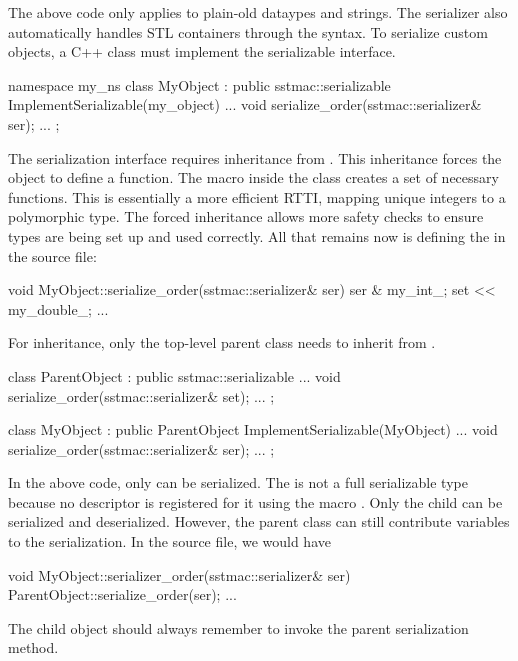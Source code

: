 The above code only applies to plain-old dataypes and strings.
The serializer also automatically handles STL containers
through the \inlinecode{&} syntax.
To serialize custom objects, a C++ class must implement the serializable interface.

\begin{CppCode}
namespace my_ns {
class MyObject : 
  public sstmac::serializable
{
 ImplementSerializable(my_object)
 ...
 void serialize_order(sstmac::serializer& ser);
 ...
};
}
\end{CppCode}
The serialization interface requires inheritance from .
This inheritance forces the object to define a  function.
The macro  inside the class creates a set of necessary functions.
This is essentially a more efficient RTTI, mapping unique integers to a polymorphic type.
The forced inheritance allows more safety checks to ensure types are being set up and used correctly.
All that remains now is defining the  in the source file:

\begin{CppCode}
void MyObject::serialize_order(sstmac::serializer& ser)
{
  ser & my_int_;
  set << my_double_;
  ...
}
\end{CppCode}

For inheritance, only the top-level parent class needs to inherit from .

\begin{CppCode}
class ParentObject : 
  public sstmac::serializable
{
...
  void serialize_order(sstmac::serializer& set);
...
};

class MyObject :
  public ParentObject
{
 ImplementSerializable(MyObject)
 ...
 void serialize_order(sstmac::serializer& ser);
 ...
};
\end{CppCode}
In the above code, only  can be serialized.
The  is not a full serializable type because no descriptor is registered for it
using the macro .
Only the child can be serialized and deserialized.
However, the parent class can still contribute variables to the serialization.
In the source file, we would have

\begin{CppCode}
void MyObject::serializer_order(sstmac::serializer& ser)
{
  ParentObject::serialize_order(ser);
  ...
}
\end{CppCode}
The child object should always remember to invoke the parent serialization method.




